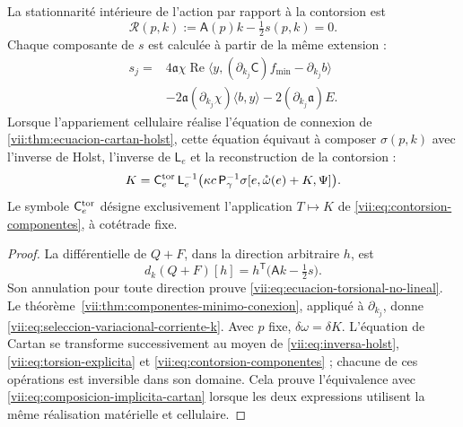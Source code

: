 \begin{proposition}
\label{vii:prop:ecuacion-torsional-no-lineal}
La stationnarité intérieure de l'action par rapport à la contorsion est
\begin{equation}
 \mathcal R(p,k):=\mathsf A(p)k-\tfrac12s(p,k)=0.
 \label{vii:eq:ecuacion-torsional-no-lineal}
\end{equation}
Chaque composante de \(s\) est calculée à partir de la même extension :
\begin{equation}
 \begin{split}
 s_j={}&4\mathfrak a\chi\operatorname{Re}
       \langle y,(\partial_{k_j}\mathsf C)f_{\min}
                         -\partial_{k_j}b\rangle\\
 &-2\mathfrak a(\partial_{k_j}\chi)\langle b,y\rangle
       -2(\partial_{k_j}\mathfrak a)E.
 \end{split}
 \label{vii:eq:seleccion-variacional-corriente-k}
\end{equation}
Lorsque l'appariement cellulaire réalise l'équation de connexion de
\ref{vii:thm:ecuacion-cartan-holst}, cette équation équivaut à composer
\(\sigma(p,k)\) avec l'inverse de Holst, l'inverse de
\(\mathsf L_e\) et la reconstruction de la contorsion :
\begin{equation}
 K=\mathsf C_e^{\rm tor}\,\mathsf L_e^{-1}
           \bigl(\kappa c\,\mathsf P_\gamma^{-1}
             \sigma[e,\mathring\omega(e)+K,\Psi]\bigr).
 \label{vii:eq:composicion-implicita-cartan}
\end{equation}
Le symbole \(\mathsf C_e^{\rm tor}\) désigne exclusivement l'application \(T\mapsto K\) de \eqref{vii:eq:contorsion-componentes}, à cotétrade fixe.
\end{proposition}

\begin{proof}
La différentielle de \(Q+F\), dans la direction arbitraire \(h\), est
\[
 d_k(Q+F)[h]
   =h^{\mathsf T}\bigl(\mathsf A k-\tfrac12s\bigr).
\]
Son annulation pour toute direction prouve \eqref{vii:eq:ecuacion-torsional-no-lineal}. Le théorème~\ref{vii:thm:componentes-minimo-conexion}, appliqué à \(\partial_{k_j}\), donne \eqref{vii:eq:seleccion-variacional-corriente-k}. Avec \(p\) fixe, \(\delta\omega=\delta K\). L'équation de Cartan se transforme successivement au moyen de \eqref{vii:eq:inversa-holst}, \eqref{vii:eq:torsion-explicita} et \eqref{vii:eq:contorsion-componentes} ; chacune de ces opérations est inversible dans son domaine. Cela prouve l'équivalence avec \eqref{vii:eq:composicion-implicita-cartan} lorsque les deux expressions utilisent la même réalisation matérielle et cellulaire.
\end{proof}

